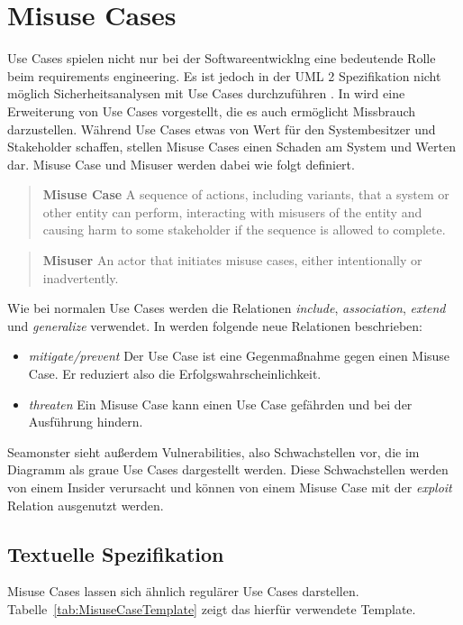 \section{Misuse Cases}

Use Cases spielen nicht nur bei der Softwareentwicklng eine bedeutende Rolle beim requirements engineering. Es ist jedoch in der UML 2 Spezifikation nicht möglich Sicherheitsanalysen mit Use Cases durchzuführen \cite{sindre2005eliciting}. 
In \cite{sindre2005eliciting} wird eine Erweiterung von Use Cases vorgestellt, die es auch ermöglicht Missbrauch darzustellen. Während Use Cases etwas von Wert für den Systembesitzer und Stakeholder schaffen, stellen Misuse Cases einen Schaden am System und Werten dar.
Misuse Case und Misuser werden dabei wie folgt definiert.
\begin{quote}
\textbf{Misuse Case} A sequence of actions, including variants, that a system or other entity can perform, interacting with misusers of the entity and causing harm to some stakeholder if the sequence is allowed to complete. \cite{sindre2005eliciting}
\end{quote}

\begin{quote}
\textbf{Misuser} An actor that initiates misuse cases, either intentionally or inadvertently. \cite{sindre2005eliciting}
\end{quote}

Wie bei normalen Use Cases werden die Relationen \textit{include}, \textit{association}, \textit{extend} und \textit{generalize} verwendet.
In \cite{sindre2005eliciting} werden folgende neue Relationen beschrieben:
\begin{itemize}
\item \textit{mitigate/prevent} Der Use Case ist eine Gegenmaßnahme gegen einen Misuse Case. Er reduziert also die Erfolgswahrscheinlichkeit.
\item \textit{threaten} Ein Misuse Case kann einen Use Case gefährden und bei der Ausführung hindern.
\end{itemize}

Seamonster sieht außerdem Vulnerabilities, also Schwachstellen vor, die im Diagramm als graue Use Cases dargestellt werden. Diese Schwachstellen werden von einem Insider verursacht und können von einem Misuse Case mit der \textit{exploit} Relation ausgenutzt werden.

\subsection{Textuelle Spezifikation}
Misuse Cases lassen sich ähnlich regulärer Use Cases darstellen. Tabelle~\ref{tab:MisuseCaseTemplate} zeigt das hierfür verwendete Template. 

